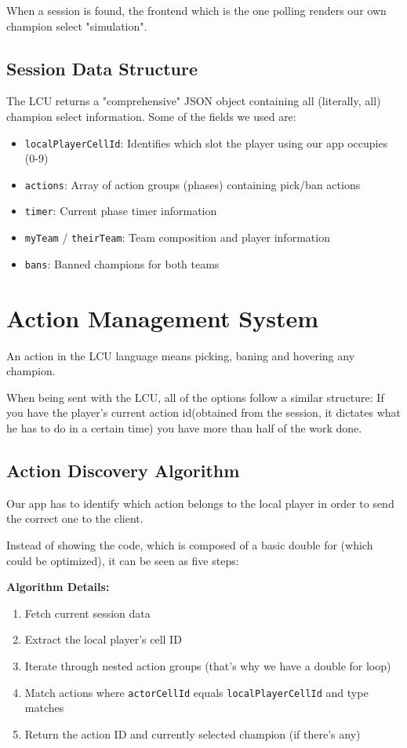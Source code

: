 \documentclass[12pt, a4paper]{article}
\begin{document}
    When a session is found, the frontend which is the one polling renders our own champion select "simulation".

    \subsection{Session Data Structure}

    The LCU returns a "comprehensive" JSON object containing all (literally, all) champion select information. Some of the fields we used are:

    \begin{itemize}
        \item \texttt{localPlayerCellId}: Identifies which slot the player using our app occupies (0-9)
        \item \texttt{actions}: Array of action groups (phases) containing pick/ban actions
        \item \texttt{timer}: Current phase timer information
        \item \texttt{myTeam} / \texttt{theirTeam}: Team composition and player information
        \item \texttt{bans}: Banned champions for both teams
    \end{itemize}

    \newpage
    \section{Action Management System}

    An action in the LCU language means picking, baning and hovering any champion.

    When being sent with the LCU, all of the options follow a similar structure: If you have the player's current action id(obtained from the session, it dictates what he has to do in a certain time) you have more than half of the work done.

    \subsection{Action Discovery Algorithm}

    Our app has to identify which action belongs to the local player in order to send the correct one to the client.

    Instead of showing the code, which is composed of a basic double for (which could be optimized), it can be seen as five steps:

    \textbf{Algorithm Details:}
    \begin{enumerate}
        \item Fetch current session data
        \item Extract the local player's cell ID
        \item Iterate through nested action groups (that's why we have a double for loop)
        \item Match actions where \texttt{actorCellId} equals \texttt{localPlayerCellId} and type matches
        \item Return the action ID and currently selected champion (if there's any)
    \end{enumerate}
\end{document}
